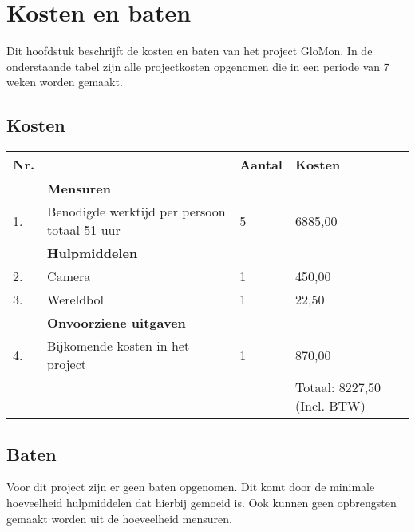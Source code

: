 \chapter{Kosten en baten} \label{cha:kostenenbaten}

Dit hoofdstuk beschrijft de kosten en baten van het project GloMon. In de onderstaande tabel zijn alle projectkosten opgenomen die in een periode van 7 weken worden gemaakt.

\section{Kosten} \label{subsec:kosten}

    \begin{tabular}{ | l | l | l | l | }
    	\hline
    	Nr. &    & Aantal & Kosten \\ \hline
    		& \textbf{Mensuren} \\ \hline
    	1.	& Benodigde werktijd per persoon totaal 51 uur & 5 & 6885,00 \\ \hline
    		& \textbf{Hulpmiddelen} & & \\ \hline
    	2.	& Camera & 1 & 450,00 \\ \hline
    	3.	& Wereldbol & 1 & 22,50 \\ \hline
     		& \textbf{Onvoorziene uitgaven} \\ \hline
     	4.  & Bijkomende kosten in het project & 1 & 870,00 \\ \hline
     	&	& 	& Totaal: 8227,50 (Incl. BTW) \\ \hline
  	\end{tabular}

\section{Baten} \label{subsec:baten}

Voor dit project zijn er geen baten opgenomen. Dit komt door de minimale hoeveelheid hulpmiddelen dat hierbij gemoeid is. Ook kunnen geen opbrengsten gemaakt worden uit de hoeveelheid mensuren.